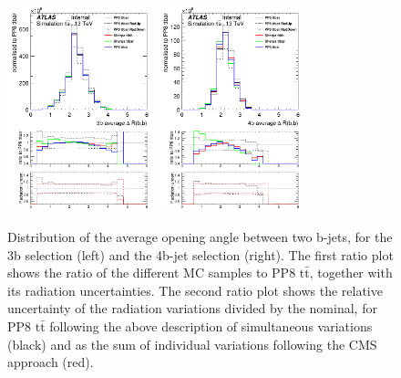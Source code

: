 \begin{figure}[!htb]
\centering
\includegraphics[width=0.38\textwidth]{Plots/ttbb/hisgenEvt_Dr_GenBJetsAverage_4j3t__div}
\includegraphics[width=0.38\textwidth]{Plots/ttbb/hisgenEvt_Dr_GenBJetsAverage_4j4t__div}
  \caption{Distribution of the average opening angle between two b-jets, for the 3b selection (left) and the 4b-jet selection (right). The first ratio plot shows the ratio of the different MC samples to PP8 $\mathrm{t\bar{t}}$, together with its radiation uncertainties. The second ratio plot shows the relative uncertainty of the radiation variations divided by the nominal, for PP8 $\mathrm{t\bar{t}}$ following the above description of simultaneous variations (black) and as the sum of individual variations following the CMS approach (red).  \label{ttbb:avedR}}
\end{figure}

